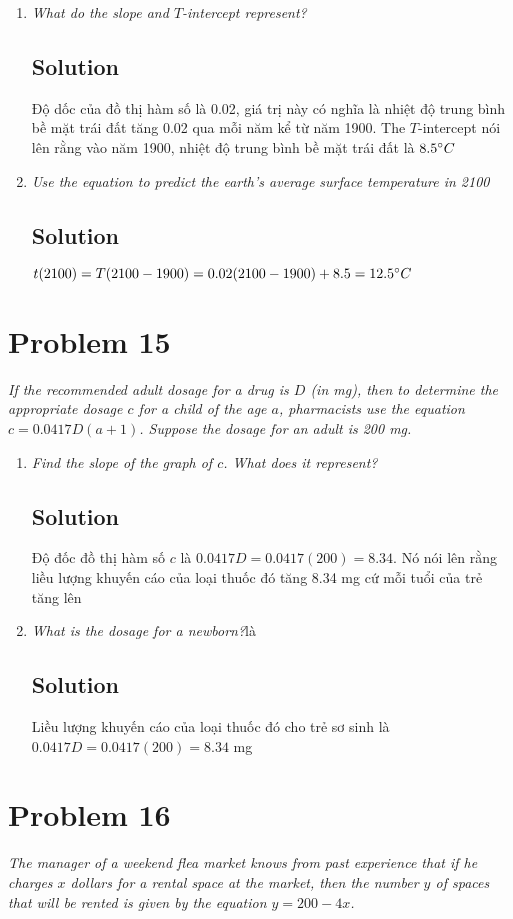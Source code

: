 \documentclass[11pt]{article}
\newcommand{\soln}{\subsection*}
\newcommand{\qn}{\textit}
\begin{document}
\begin{enumerate}
	\item \qn{What do the slope and $T$-intercept represent?}
	\soln{Solution}
	Độ dốc của đồ thị hàm số là 0.02, giá trị này có nghĩa là nhiệt độ trung bình bề mặt trái đất tăng 0.02 qua mỗi năm kể từ năm 1900. The $T$-intercept nói lên rằng vào năm 1900, nhiệt độ trung bình bề mặt trái đất là $8.5 \degree C$
	
	\item \qn{Use the equation to predict the earth's average surface temperature in 2100}
	\soln{Solution}
	$t(2100)=T(2100-1900)=0.02(2100-1900)+8.5=12.5 \degree C$
\end{enumerate}

\section*{Problem 15}

\qn{If the recommended adult dosage for a drug is $D$ (in mg), then to determine the appropriate dosage $c$ for a child of the age $a$, pharmacists use the equation $c=0.0417D(a+1)$. Suppose the dosage for an adult is 200 mg.}

\begin{enumerate}
	\item \qn{Find the slope of the graph of $c$. What does it represent?}
	\soln{Solution}
	Độ đốc đồ thị hàm số $c$ là $0.0417D=0.0417(200)=8.34$. Nó nói lên rằng liều lượng khuyến cáo của loại thuốc đó tăng 8.34 mg cứ mỗi tuổi của trẻ tăng lên
	
	\item \qn{What is the dosage for a newborn?}là
	\soln{Solution}
	Liều lượng khuyến cáo của loại thuốc đó cho trẻ sơ sinh là $0.0417D=0.0417(200)=8.34$ mg
\end{enumerate}

\section*{Problem 16}

\qn{The manager of a weekend flea market knows from past experience that if he charges $x$ dollars for a rental space at the market, then the number $y$ of spaces that will be rented is given by the equation $y=200-4x$.}
\end{document}
